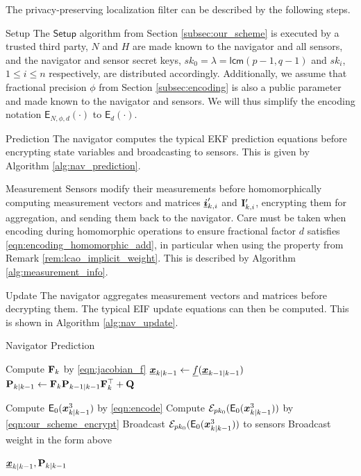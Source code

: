 \documentclass[10pt,letterpaper,oneside,twocolumn,journal]{IEEEtran}
\theoremstyle{definition}
\theoremstyle{definition}
\theoremstyle{remark}
\begin{document}
The privacy-preserving localization filter can be described by the following steps.
\begin{LaTeXdescription}
    \item[Setup] The $\mathsf{Setup}$ algorithm from Section \ref{subsec:our_scheme} is executed by a trusted third party, $N$ and $H$ are made known to the navigator and all sensors, and the navigator and sensor secret keys, $sk_0=\lambda=\mathsf{lcm}(p-1, q-1)$ and $sk_i$, $1 \leq i \leq n$ respectively, are distributed accordingly. Additionally, we assume that fractional precision $\phi$ from Section \ref{subsec:encoding} is also a public parameter and made known to the navigator and sensors. We will thus simplify the encoding notation $\mathsf{E}_{N,\phi,d}(\cdot)$ to $\mathsf{E}_{d}(\cdot)$.

    \item[Prediction] The navigator computes the typical EKF prediction equations before encrypting state variables and broadcasting to sensors. This is given by Algorithm \ref{alg:nav_prediction}.

    \item[Measurement] Sensors modify their measurements before homomorphically computing measurement vectors and matrices ${\boldsymbol{\underline{i}}}'_{k,i}$ and ${{\mathbf{I}}}'_{k,i}$, encrypting them for aggregation, and sending them back to the navigator. Care must be taken when encoding during homomorphic operations to ensure fractional factor $d$ satisfies \eqref{eqn:encoding_homomorphic_add}, in particular when using the property from Remark \ref{rem:lcao_implicit_weight}. This is described by Algorithm \ref{alg:measurement_info}.

    \item[Update] The navigator aggregates measurement vectors and matrices before decrypting them. The typical EIF update equations can then be computed. This is shown in Algorithm \ref{alg:nav_update}.
\end{LaTeXdescription}

\begin{algorithm}[htbp]
\caption{Navigator Prediction}\label{alg:nav_prediction}
\begin{algorithmic}[1]

    \State Compute ${{\mathbf{F}}}_k$ by \eqref{eqn:jacobian_f}
    \State ${\boldsymbol{\underline{x}}}_{k|k-1} \gets {\underline{f}}({\boldsymbol{\underline{x}}}_{k-1|k-1})$
    \State ${{\mathbf{P}}}_{k|k-1} \gets {\ensuremath{{\mathbf{F}}}}_k{{\mathbf{P}}}_{k-1|k-1}{{\mathbf{F}}}_k^\top + {{\mathbf{Q}}}$

    \State Compute $\mathsf{E}_{0}({\boldsymbol{x}}^3_{k|k-1})$ by \eqref{eqn:encode}
    \State Compute $\mathcal{E}_{pk_0}(\mathsf{E}_{0}({\boldsymbol{x}}^3_{k|k-1}))$ by \eqref{eqn:our_scheme_encrypt}
    \State Broadcast $\mathcal{E}_{pk_0}(\mathsf{E}_{0}({\boldsymbol{x}}^3_{k|k-1}))$ to sensors
        \State Broadcast weight in the form above
    \EndFor

    \State \Return ${\boldsymbol{\underline{x}}}_{k|k-1}, {{\mathbf{P}}}_{k|k-1}$
    \EndProcedure
\end{algorithmic}
\end{algorithm}
\end{document}
